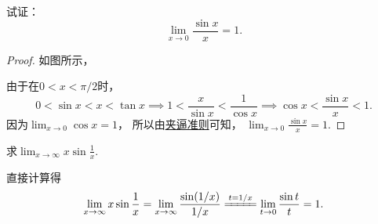 \begin{example}[重要极限I]
试证：\begin{equation}\label{equation:函数极限.重要极限1}
	\lim_{x\to0} \frac{\sin x}{x} = 1.
\end{equation}
\begin{proof}
如图所示，
\begin{center}
\end{center}
由于在\(0 < x < \pi/2\)时，\begin{equation*}
	0 < \sin x < x < \tan x
	\implies
	1 < \frac{x}{\sin x} < \frac{1}{\cos x}
	\implies
	\cos x < \frac{\sin x}{x} < 1.
\end{equation*}
因为\(\lim_{x\to0}\cos x = 1\)，%
所以由\hyperref[theorem:数列极限.夹逼准则]{夹逼准则}可知，
\(\lim_{x\to0} \frac{\sin x}{x} = 1\).
\end{proof}
\end{example}

\begin{example}
求\(\lim_{x\to\infty} x \sin\frac1x\).
\begin{solution}
直接计算得\begin{equation*}
	\lim_{x\to\infty} x \sin\frac1x
	= \lim_{x\to\infty} \frac{\sin(1/x)}{1/x}
	\xlongequal{t=1/x} \lim_{t\to0} \frac{\sin t}{t}
	= 1.
\end{equation*}
\end{solution}
\end{example}

